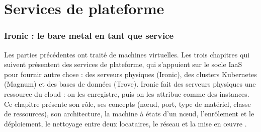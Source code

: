 
\part{Services de plateforme}\label{part:plateformes}

\section{Ironic : le bare metal en tant que service}\label{chap:ironic}

Les parties précédentes ont traité de machines virtuelles. Les trois chapitres qui suivent présentent des services de
plateforme, qui s'appuient sur le socle IaaS pour fournir autre chose : des serveurs physiques (Ironic), des clusters Kubernetes
(Magnum) et des bases de données (Trove). Ironic fait des serveurs physiques une ressource du cloud : on les enregistre, puis on
les attribue comme des instances. Ce chapitre présente son rôle, ses concepts (nœud, port, type de matériel, classe de
ressources), son architecture, la machine à états d'un nœud, l'enrôlement et le déploiement, le nettoyage entre deux locataires,
le réseau et la mise en œuvre \parencite{ironic-index}.

